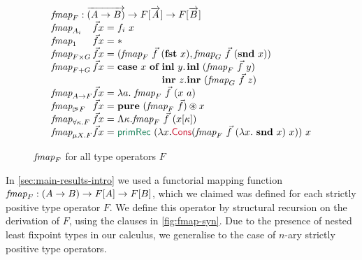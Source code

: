 \begin{figure}[t]
  \centering
\begin{displaymath}
  \begin{array}{l@{}c@{}c@{}c@{}c@{}l}
    \ident{fmap}_F : \overrightarrow{(A \to B)} \to F[\overrightarrow{A}] \to F[\overrightarrow{B}] \\
    \begin{array}{@{}l@{}l@{}l@{\hspace{0.3em}}c@{\hspace{0.3em}}l}
    \ident{fmap}_{A_i}&\vec{f}&x & = & f_i~x \\
    \ident{fmap}_1    &\vec{f}&x & = & * \\
    \ident{fmap}_{F \times G}&\vec{f}&x & = & (\ident{fmap}_F~\vec{f}~(\kw{fst}~x), \ident{fmap}_G~\vec{f}~(\kw{snd}~x)) \\
    \ident{fmap}_{F + G}&\vec{f}&x & = & \kw{case}~x~\kw{of}~
    \begin{array}[t]{@{}l@{}l}
      \kw{inl}~y. & \kw{inl}~(\ident{fmap}_F~\vec{f}~y) \\
      \kw{inr}~z. & \kw{inr}~(\ident{fmap}_G~\vec{f}~z)
    \end{array}\\
    \ident{fmap}_{A\to F}&\vec{f}&x&=&\lambda a.~\ident{fmap}_F~\vec{f}~(x~a) \\
    \ident{fmap}_{\delay\kappa F}&\vec{f}&x&=&\kw{pure}~(\ident{fmap}_F~\vec{f}) \circledast x \\
    \ident{fmap}_{\forall\kappa.F}&\vec{f}&x&=&\Lambda \kappa. \ident{fmap}_F~\vec{f}~(x[\kappa]) \\
    \ident{fmap}_{\mu X. F}&\vec{f}&x&=&\elim{primRec}~(\lambda x. \cons{Cons}(\ident{fmap}_F~\vec{f}~(\lambda x.~\kw{snd}~x)~x))~x      
    \end{array}
  \end{array}
\end{displaymath}  
  \caption{$\textit{fmap}_F$ for all type operators $F$}
  \label{fig:fmap-syn}
\end{figure}

In \autoref{sec:main-results-intro} we used a functorial mapping
function $\textit{fmap}_F : (A \to B) \to F[A] \to F[B]$, which we
claimed was defined for each strictly positive type operator $F$. We
define this operator by structural recursion on the derivation of $F$,
using the clauses in \autoref{fig:fmap-syn}. Due to the presence of
nested least fixpoint types in our calculus, we generalise to the case
of $n$-ary strictly positive type operators.


